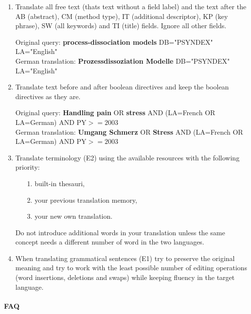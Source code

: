 \documentclass[a4paper,10pt]{article}
\newcommand{\ex}[1]{\begin{tcolorbox}[]{#1}\end{tcolorbox}}
\begin{document}
\begin{enumerate}

 \item Translate all free text (thats text without a field label) and the text after the AB (abstract), CM (method type), IT (additional descriptor), KP (key phrase), SW (all keywords) and TI (title) fields. Ignore all other fields.
 \ex{Original query: {\bf process-dissociation models} DB="PSYNDEX" LA="English" \\
     German translation: {\bf Prozessdissoziation Modelle} DB="PSYNDEX" LA="English"}

 \item Translate text before and after boolean directives and keep the boolean directives as they are.
 \ex{ Original query: {\bf Handling pain} OR {\bf stress} AND (LA=French OR LA=German) AND PY$>=2003$ \\
  German translation: {\bf Umgang Schmerz} OR  {\bf Stress} AND  (LA=French OR LA=German) AND PY$>=2003$}
  
 \item Translate terminology (E2) using the available resources with the following priority: 
 \begin{enumerate}
 \item[1.]  built-in thesauri, 
 \item[2.]  your previous translation memory,
 \item[3.]  your new own translation. 
 \end{enumerate}
 Do not introduce additional words in your translation unless the same concept needs a different number of word in the two languages.

 \item When translating grammatical sentences (E1) try to preserve the original meaning and try to work with the least possible number of editing operations (word insertions, deletions and swaps) while keeping fluency in the target language. 

\end{enumerate}



\paragraph{FAQ}
\end{document}
